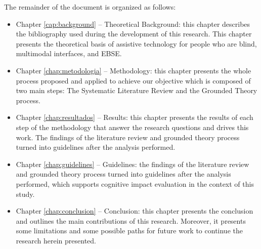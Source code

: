 The remainder of the document is organized as follows:
\begin{itemize}
    \item Chapter \ref{cap:background} – Theoretical Background: this chapter describes the bibliography used during the development of this research. This chapter presents the theoretical basis of assistive technology for people who are blind, multimodal interfaces, and \gls{EBSE}.
    \item Chapter \ref{chap:metodologia} – Methodology: this chapter presents the whole process proposed and applied to achieve our objective which is composed of two main steps: The Systematic Literature Review and the Grounded Theory process.
    \item Chapter \ref{chap:resultados} – Results: this chapter presents the results of each step of the methodology that answer the research questions and drives this work. The findings of the literature review and grounded theory process turned into guidelines after the analysis performed. 
    \item Chapter \ref{chap:guidelines} – Guidelines: the findings of the literature review and grounded theory process turned into guidelines after the analysis performed, which  supports cognitive impact evaluation in the context of this study.
    \item Chapter \ref{chap:conclusion} – Conclusion: this chapter presents the conclusion and outlines the main contributions of this research. Moreover, it presents some limitations and some possible paths for future work to continue the research herein presented.
\end{itemize}